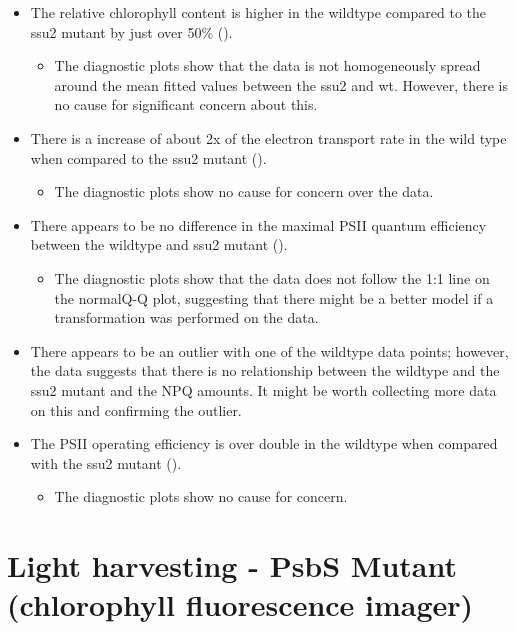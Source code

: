 \documentclass[
]{article}
\begin{document}
\begin{itemize}
\tightlist
\item
  The relative chlorophyll content is higher in the wildtype compared to
  the ssu2 mutant by just over 50\% ({}).

  \begin{itemize}
  \tightlist
  \item
    The diagnostic plots show that the data is not homogeneously spread
    around the mean fitted values between the ssu2 and wt. However,
    there is no cause for significant concern about this.
  \end{itemize}
\item
  There is a increase of about 2x of the electron transport rate in the
  wild type when compared to the ssu2 mutant ({}).

  \begin{itemize}
  \tightlist
  \item
    The diagnostic plots show no cause for concern over the data.
  \end{itemize}
\item
  There appears to be no difference in the maximal PSII quantum
  efficiency between the wildtype and ssu2 mutant ({}).

  \begin{itemize}
  \tightlist
  \item
    The diagnostic plots show that the data does not follow the 1:1 line
    on the normalQ-Q plot, suggesting that there might be a better model
    if a transformation was performed on the data.
  \end{itemize}
\item
  There appears to be an outlier with one of the wildtype data points;
  however, the data suggests that there is no relationship between the
  wildtype and the ssu2 mutant and the NPQ amounts. It might be worth
  collecting more data on this and confirming the outlier.
\item
  The PSII operating efficiency is over double in the wildtype when
  compared with the ssu2 mutant ({}).

  \begin{itemize}
  \tightlist
  \item
    The diagnostic plots show no cause for concern.
  \end{itemize}
\end{itemize}

\section{Light harvesting - PsbS Mutant (chlorophyll fluorescence
imager)}\label{light-harvesting---psbs-mutant-chlorophyll-fluorescence-imager}
\end{document}
